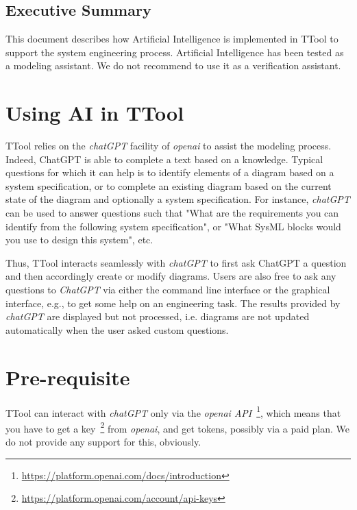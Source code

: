 \documentclass[12pt]{article}
\begin{document}
\subsection{Executive Summary}

This document describes how Artificial Intelligence is implemented in TTool to support the system engineering process. Artificial Intelligence has been tested as a modeling assistant. We do not recommend to use it as a verification assistant.

\newpage

\section{Using AI in TTool}
TTool relies on the \textit{chatGPT} facility of \textit{openai} to assist the modeling process. Indeed, ChatGPT is able to complete a text based on a knowledge. Typical questions for which it can help is to identify elements of a diagram based on a system specification, or to complete an existing diagram based on the current state of the diagram and optionally a system specification. For instance, \textit{chatGPT} can be used to answer questions such that "What are the requirements you can identify from the following system specification", or "What SysML blocks would you use to design this system", etc.

Thus, TTool interacts seamlessly with \textit{chatGPT} to first ask ChatGPT a question and then accordingly create or modify diagrams. Users are also free to ask any questions to \textit{ChatGPT} via either the command line interface or the graphical interface, e.g., to get some help on an engineering task. The results provided by \textit{chatGPT} are displayed but not processed, i.e. diagrams are not updated automatically when the user asked custom questions.

\section{Pre-requisite}
TTool can interact with \textit{chatGPT} only via the \textit{openai API}~\footnote{
\href{https://platform.openai.com/docs/introduction}{https://platform.openai.com/docs/introduction}
}, which means that you have to get a key~\footnote{
    \href{https://platform.openai.com/account/api-keys}{https://platform.openai.com/account/api-keys}
    } from \textit{openai}, and get tokens, possibly via a paid plan.  We do not provide any support for this, obviously.
\end{document}
